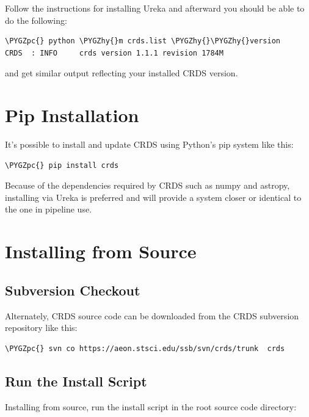 \documentclass[letterpaper,10pt,english]{sphinxmanual}
\def\PYGZpc{\char`\%}
\def\PYGZhy{\char`\-}
\begin{document}
Follow the instructions for installing Ureka and afterward you should be able to do the following:

\begin{Verbatim}[commandchars=\\\{\}]
\PYGZpc{} python \PYGZhy{}m crds.list \PYGZhy{}\PYGZhy{}version
CRDS  : INFO     crds version 1.1.1 revision 1784M
\end{Verbatim}

and get similar output reflecting your installed CRDS version.


\section{Pip Installation}
\label{installation:pip-installation}
It's possible to install and update CRDS using Python's pip system like this:

\begin{Verbatim}[commandchars=\\\{\}]
\PYGZpc{} pip install crds
\end{Verbatim}

Because of the dependencies required by CRDS such as numpy and astropy,  installing via Ureka is preferred
and will provide a system closer or identical to the one in pipeline use.


\section{Installing from Source}
\label{installation:installing-from-source}

\subsection{Subversion Checkout}
\label{installation:subversion-checkout}
Alternately, CRDS source code can be downloaded from the CRDS subversion repository like this:

\begin{Verbatim}[commandchars=\\\{\}]
\PYGZpc{} svn co https://aeon.stsci.edu/ssb/svn/crds/trunk  crds
\end{Verbatim}


\subsection{Run the Install Script}
\label{installation:run-the-install-script}
Installing from source,  run the install script in the root source code directory:
\end{document}
